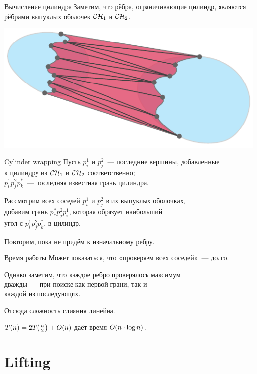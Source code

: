 \documentclass[12pt,aspectratio=169,svgnames]{beamer}
\begin{document}
\begin{frame}{Вычисление цилиндра}
	Заметим, что рёбра, ограничивающие цилиндр, являются \\
	рёбрами выпуклых оболочек \(\mathcal{C}\mathcal{H}_1\) и \(\mathcal{C}\mathcal{H}_2\).
\begin{center} \includegraphics[scale=1.04]{svg/CHconquerPolygonal} \end{center}
\end{frame}


\begin{frame}{Cylinder wrapping}
	Пусть \(p^1_i\) и \(p^2_j\)~— последние вершины, добавленные \\
	к цилиндру из \(\mathcal{C}\mathcal{H}_1\) и \(\mathcal{C}\mathcal{H}_2\) соответственно; \\
	\(p^1_i p^2_j p^*_k\)~— последняя известная грань цилиндра.

	Рассмотрим всех соседей \(p^1_i\) и \(p^2_j\) в их выпуклых оболочках, \\
	добавим грань \(p^*_* p^2_j p^1_i\), которая образует наибольший \\
	угол с \(p^1_i p^2_j p^*_k\), в цилиндр.

	Повторим, пока не придём к изначальному ребру.
\end{frame}


\begin{frame}{Время работы}
	Может показаться, что «проверяем всех соседей»~— долго.

	Однако заметим, что каждое ребро проверялось максимум \\
	дважды~— при поиске как первой грани, так и \\
	каждой из последующих.

	Отсюда сложность слияния линейна.

	\(T(n) = 2 T\lr*{\frac{n}{2}} + O(n)\) даёт время \(O\lr*{n \cdot \log n}\).
\end{frame}


\section{Lifting}
\end{document}
